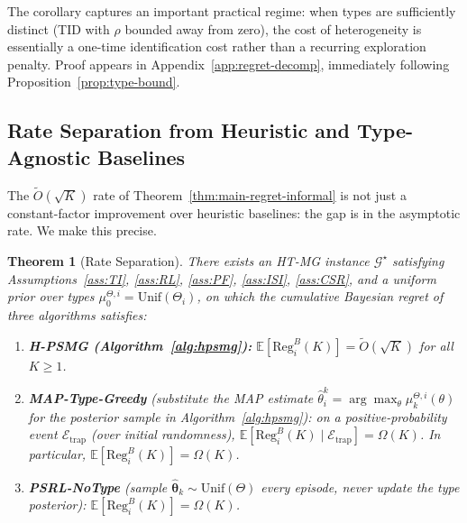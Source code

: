 \documentclass{article}
\newtheorem{theorem}{Theorem}[section]
\begin{document}
The corollary captures an important practical regime: when types are sufficiently distinct (TID with $\rho$ bounded away from zero), the cost of heterogeneity is essentially a one-time identification cost rather than a recurring exploration penalty. Proof appears in Appendix~\ref{app:regret-decomp}, immediately following Proposition~\ref{prop:type-bound}.

\subsection{Rate Separation from Heuristic and Type-Agnostic Baselines}
\label{sec:rate-separation}

The $\tilde{O}(\sqrt{K})$ rate of Theorem~\ref{thm:main-regret-informal} is not just a constant-factor improvement over heuristic baselines: the gap is in the asymptotic rate. We make this precise.

\begin{theorem}[Rate Separation]
\label{thm:rate-separation}
There exists an HT-MG instance $\mathcal{G}^\star$ satisfying Assumptions~\ref{ass:TI}, \ref{ass:RL}, \ref{ass:PF}, \ref{ass:ISI}, \ref{ass:CSR}, and a uniform prior over types $\mu_0^{\Theta,i} = \mathrm{Unif}(\Theta_i)$, on which the cumulative Bayesian regret of three algorithms satisfies:
\begin{enumerate}
\item[(i)] \textbf{H-PSMG (Algorithm~\ref{alg:hpsmg}):} $\mathbb{E}[\mathrm{Reg}_i^B(K)] = \tilde{O}(\sqrt{K})$ for all $K \geq 1$.
\item[(ii)] \textbf{MAP-Type-Greedy} (substitute the MAP estimate $\hat{\theta}_i^k = \arg\max_\theta \mu_k^{\Theta,i}(\theta)$ for the posterior sample in Algorithm~\ref{alg:hpsmg}): on a positive-probability event $\mathcal{E}_{\mathrm{trap}}$ (over initial randomness), $\mathbb{E}[\mathrm{Reg}_i^B(K) \mid \mathcal{E}_{\mathrm{trap}}] = \Omega(K)$. In particular, $\mathbb{E}[\mathrm{Reg}_i^B(K)] = \Omega(K)$.
\item[(iii)] \textbf{PSRL-NoType} (sample $\hat{\boldsymbol{\theta}}_k \sim \mathrm{Unif}(\Theta)$ every episode, never update the type posterior): $\mathbb{E}[\mathrm{Reg}_i^B(K)] = \Omega(K)$.
\end{enumerate}
\end{theorem}
\end{document}
